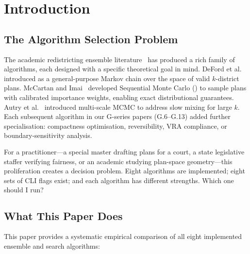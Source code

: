 \section{Introduction}
\label{sec:introduction}

\subsection{The Algorithm Selection Problem}

The academic redistricting ensemble literature~\citep{deford2021,mccartan2020,
cannon2022,janson2022} has produced a rich family of algorithms, each
designed with a specific theoretical goal in mind.
DeFord et al.~\citep{deford2021} introduced \recom{} as a general-purpose
Markov chain over the space of valid $k$-district plans.
McCartan and Imai~\citep{mccartan2020} developed Sequential Monte Carlo
(\smc{}) to sample plans with calibrated importance weights, enabling
exact distributional guarantees.
Autry et al.~\citep{autry2021} introduced multi-scale MCMC to address slow
mixing for large $k$.
Each subsequent algorithm in our G-series papers (G.6--G.13) added
further specialisation: compactness optimisation, reversibility, VRA
compliance, or boundary-sensitivity analysis.

For a practitioner---a special master drafting plans for a court, a state
legislative staffer verifying fairness, or an academic studying plan-space
geometry---this proliferation creates a decision problem.
Eight algorithms are implemented; eight sets of CLI flags exist; and each
algorithm has different strengths.
Which one should I run?

\subsection{What This Paper Does}

This paper provides a systematic empirical comparison of all eight
implemented ensemble and search algorithms:

